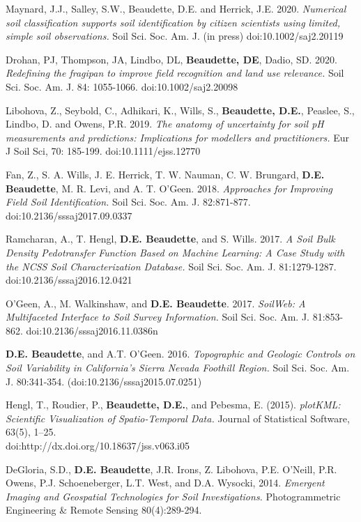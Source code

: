 \documentclass[overlapped,line,10pt,letterpaper]{res}
\begin{document}
\begin{resume}
Maynard, J.J., Salley, S.W., Beaudette, D.E. and Herrick, J.E. 2020. {\em Numerical soil classification supports soil identification by citizen scientists using limited, simple soil observations.} Soil Sci. Soc. Am. J. (in press) doi:10.1002/saj2.20119

Drohan, PJ, Thompson, JA, Lindbo, DL, \textbf{Beaudette, DE}, Dadio, SD. 2020. {\em Redefining the fragipan to improve field recognition and land use relevance.} Soil Sci. Soc. Am. J. 84: 1055-1066. doi:10.1002/saj2.20098

Libohova, Z., Seybold, C., Adhikari, K., Wills, S., \textbf{Beaudette, D.E.}, Peaslee, S., Lindbo, D. and Owens, P.R. 2019. {\em The anatomy of uncertainty for soil pH measurements and predictions: Implications for modellers and practitioners.} Eur J Soil Sci, 70: 185-199. doi:10.1111/ejss.12770

Fan, Z., S. A. Wills, J. E. Herrick, T. W. Nauman, C. W. Brungard, \textbf{D.E. Beaudette}, M. R. Levi, and A. T. O’Geen. 2018. {\em Approaches for Improving Field Soil Identification.} Soil Sci. Soc. Am. J. 82:871-877. doi:10.2136/sssaj2017.09.0337

Ramcharan, A., T. Hengl, \textbf{D.E. Beaudette}, and S. Wills. 2017. {\em A Soil Bulk Density Pedotransfer Function Based on Machine Learning: A Case Study with the NCSS Soil Characterization Database.} Soil Sci. Soc. Am. J. 81:1279-1287. doi:10.2136/sssaj2016.12.0421

O’Geen, A., M. Walkinshaw, and \textbf{D.E. Beaudette}. 2017. {\em SoilWeb: A Multifaceted Interface to Soil Survey Information.} Soil Sci. Soc. Am. J. 81:853-862. doi:10.2136/sssaj2016.11.0386n

\textbf{D.E. Beaudette}, and A.T. O’Geen. 2016. {\em Topographic and Geologic Controls on Soil Variability in California’s Sierra Nevada Foothill Region.} Soil Sci. Soc. Am. J. 80:341-354. (doi:10.2136/sssaj2015.07.0251)

Hengl, T., Roudier, P., \textbf{Beaudette, D.E.}, and Pebesma, E. (2015). {\em plotKML: Scientific Visualization of Spatio-Temporal Data.} Journal of Statistical Software, 63(5), 1--25. \\
doi:http://dx.doi.org/10.18637/jss.v063.i05

DeGloria, S.D., \textbf{D.E. Beaudette}, J.R. Irons, Z. Libohova, P.E. O’Neill, P.R. Owens, P.J. Schoeneberger, L.T. West, and D.A. Wysocki, 2014. {\em Emergent Imaging and Geospatial Technologies for Soil Investigations.} Photogrammetric Engineering \& Remote Sensing 80(4):289-294.


\end{resume}
\end{document}
